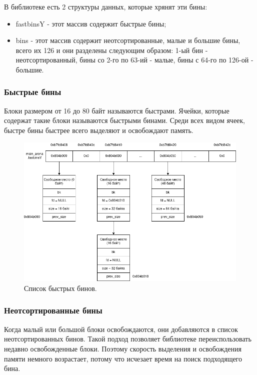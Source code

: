 В библиотеке есть 2 структуры данных, которые хрянят эти бины:
\begin{itemize}
	\item fastbinsY - этот массив содержит быстрые бины;
	\item bins - этот массив содержит неотсортированные, малые и большие бины, всего их 126 и они разделены следующим образом: 1-ый бин - неотсортированный, бины со 2-го по 63-ий - малые, бины с 64-го по 126-ой - большие.
\end{itemize}

\subsubsection{Быстрые бины}
Блоки размером от 16 до 80 байт называются быстрами. Ячейки, которые содержат такие блоки называются быстрыми бинами. Среди всех видом ячеек, быстре бины быстрее всего выделяют и освобождают память.

\begin{figure}[!h]
	\begin{center}
		\includegraphics[scale=0.6]{images/glibc-malloc-fast-bin-snap.png}
		\caption{Список быстрых бинов.}
		\label{glibc-malloc-fast-bin-snap}
	\end{center}
\end{figure}

\subsubsection{Неотсортированные бины}
Когда малый или большой блоки освобождаются, они добавляются в список неотсортированных бинов. Такой подход позволяет библиотеке переиспользовать недавно освобожденные блоки. Поэтому скорость выделения и освобождения памяти немного возрастает, потому что исчезает время на поиск подходящего бина.

